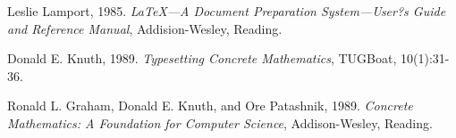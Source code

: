 \documentclass[11pt]{article}    %
\begin{document}
\begin{thebibliography}{9}

 Leslie Lamport, 1985. 
\emph{\LaTeX---A Document Preparation System---User?s Guide and Reference Manual},
Addision-Wesley, Reading.

Donald E. Knuth, 1989. \emph{Typesetting Concrete
Mathematics}, TUGBoat, 10(1):31-36.

Ronald L. Graham, Donald E. Knuth, and Ore
Patashnik, 1989. \emph{Concrete Mathematics: A Foundation for
Computer Science}, Addison-Wesley, Reading.
\end{thebibliography}
\end{document}
